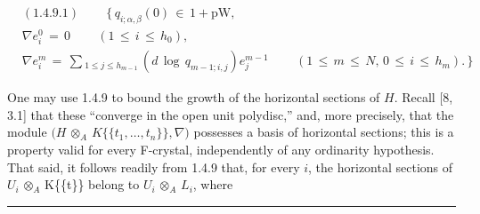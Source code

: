 \documentclass[9pt]{article}
\newcommand{\CanonText}[1]{\par{\fontsize{8.0}{9.35}\selectfont\RaggedRight #1\par}\vspace{2.2pt}}
\newenvironment{CanonMathBlock}{\par\vspace{1.2pt}\begin{center}\fontsize{6.8}{8.0}\selectfont\(\displaystyle}{\)\end{center}\vspace{1.2pt}}
\begin{document}
\begin{minipage}[t][\dimexpr\textheight-5pt\relax][t]{\textwidth}
\begin{CanonMathBlock}
\begin{aligned}
& (1.4.9.1)\qquad\,\lbrace{}\,q_{i;\alpha{},\beta{}}(0)\,\in{}\,1+\text{pW},\\
& \nabla{}e_{i}^{0}\,=\,0\qquad\,(1\,\leq{}\,i\,\leq{}\,h_{0}),\\
& \nabla{}e_{i}^{m}\,=\,\sum{}_{1\leq{}j\leq{}h_{m-1}}\,(d\,\operatorname{log}\,q_{m-1;i,j})e_{j}^{m-1}\qquad\,(1\,\leq{}\,m\,\leq{}\,N,\,0\,\leq{}\,i\,\leq{}\,h_{m}).\,\rbrace{}
\end{aligned}
\end{CanonMathBlock}
\CanonText{One may use 1.4.9 to bound the growth of the horizontal sections of \(H\). Recall [8, 3.1] that these “converge in the open unit polydisc,” and, more precisely, that the module \((H\) \(\otimes{}_{A}\) \(K\lbrace{}\lbrace{}t_{1},\ldots{},t_{n}\rbrace{}\rbrace{},\nabla{})\) possesses a basis of horizontal sections; this is a property valid for every F-crystal, independently of any ordinarity hypothesis. That said, it follows readily from 1.4.9 that, for every \(i\), the horizontal sections of \(U_{i}\) \(\otimes{}_{A}\) K\{\{t\}\} belong to \(U_{i}\) \(\otimes{}_{A}\) \(L_{i}\), where}
\vfill
{\color{Accent}\hrule height 0.35pt}\vspace{3pt}
\end{minipage}
\newpage
\end{document}
